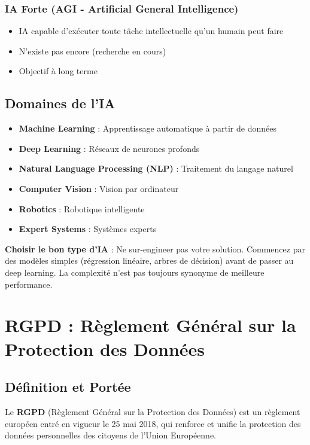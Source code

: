 \documentclass[11pt,a4paper]{article}
\begin{document}
\subsubsection{IA Forte (AGI - Artificial General Intelligence)}
\begin{itemize}
    \item IA capable d'exécuter toute tâche intellectuelle qu'un humain peut faire
    \item N'existe pas encore (recherche en cours)
    \item Objectif à long terme
\end{itemize}

\subsection{Domaines de l'IA}

\begin{itemize}
    \item \textbf{Machine Learning} : Apprentissage automatique à partir de données
    \item \textbf{Deep Learning} : Réseaux de neurones profonds
    \item \textbf{Natural Language Processing (NLP)} : Traitement du langage naturel
    \item \textbf{Computer Vision} : Vision par ordinateur
    \item \textbf{Robotics} : Robotique intelligente
    \item \textbf{Expert Systems} : Systèmes experts
\end{itemize}

\begin{tipbox}
\textbf{Choisir le bon type d'IA} : Ne sur-engineer pas votre solution. Commencez par des modèles simples (régression linéaire, arbres de décision) avant de passer au deep learning. La complexité n'est pas toujours synonyme de meilleure performance.
\end{tipbox}

\section{RGPD : Règlement Général sur la Protection des Données}

\subsection{Définition et Portée}

\begin{definitionbox}
Le \textbf{RGPD} (Règlement Général sur la Protection des Données) est un règlement européen entré en vigueur le 25 mai 2018, qui renforce et unifie la protection des données personnelles des citoyens de l'Union Européenne.
\end{definitionbox}
\end{document}
